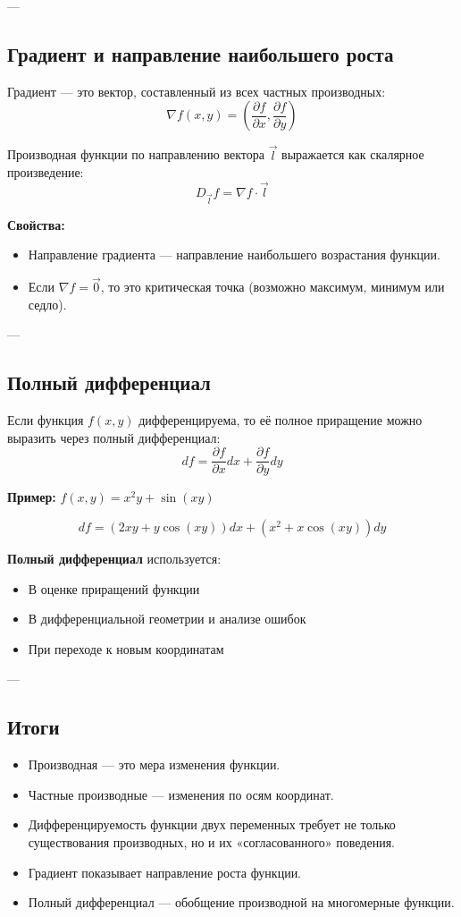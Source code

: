 ---

\subsection*{Градиент и направление наибольшего роста}

Градиент — это вектор, составленный из всех частных производных:
\[
\nabla f(x, y) = \left( \frac{\partial f}{\partial x}, \frac{\partial f}{\partial y} \right)
\]

Производная функции по направлению вектора $\vec{l}$ выражается как скалярное произведение:
\[
D_{\vec{l}} f = \nabla f \cdot \vec{l}
\]

\textbf{Свойства:}
\begin{itemize}
  \item Направление градиента — направление наибольшего возрастания функции.
  \item Если $\nabla f = \vec{0}$, то это критическая точка (возможно максимум, минимум или седло).
\end{itemize}

---

\subsection*{Полный дифференциал}

Если функция $f(x, y)$ дифференцируема, то её полное приращение можно выразить через полный дифференциал:
\[
df = \frac{\partial f}{\partial x} dx + \frac{\partial f}{\partial y} dy
\]

\textbf{Пример:} $f(x, y) = x^2 y + \sin(xy)$

\[
df = (2x y + y \cos(xy)) dx + (x^2 + x \cos(xy)) dy
\]

\textbf{Полный дифференциал} используется:
\begin{itemize}
  \item В оценке приращений функции
  \item В дифференциальной геометрии и анализе ошибок
  \item При переходе к новым координатам
\end{itemize}

---

\subsection*{Итоги}

\begin{itemize}
  \item Производная — это мера изменения функции.
  \item Частные производные — изменения по осям координат.
  \item Дифференцируемость функции двух переменных требует не только существования производных, но и их «согласованного» поведения.
  \item Градиент показывает направление роста функции.
  \item Полный дифференциал — обобщение производной на многомерные функции.
\end{itemize}
